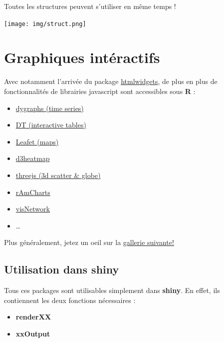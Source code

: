 \documentclass[
]{article}
\providecommand{\tightlist}{%
  \setlength{\itemsep}{0pt}\setlength{\parskip}{0pt}}
\begin{document}
Toutes les structures peuvent s'utiliser en même temps !

\texttt{[image: img/struct.png]}

\hypertarget{graphiques-intuxe9ractifs}{%
\section{Graphiques intéractifs}\label{graphiques-intuxe9ractifs}}

Avec notamment l'arrivée du package
\href{http://www.htmlwidgets.org/}{htmlwidgets}, de plus en plus de
fonctionnalités de librairies javascript sont accessibles sous
\textbf{R} :

\begin{itemize}
\tightlist
\item
  \href{http://rstudio.github.io/dygraphs/}{dygraphs (time series)}
\item
  \href{http://rstudio.github.io/DT/}{DT (interactive tables)}
\item
  \href{http://rstudio.github.io/leaflet/}{Leafet (maps)}
\item
  \href{https://github.com/rstudio/d3heatmap}{d3heatmap}
\item
  \href{http://bwlewis.github.io/rthreejs}{threejs (3d scatter \&
  globe)}
\item
  \href{http://datastorm-open.github.io/introduction_ramcharts/}{rAmCharts}
\item
  \href{http://datastorm-open.github.io/visNetwork}{visNetwork}
\item
  \ldots{}
\end{itemize}

Plus généralement, jetez un oeil sur la
\href{http://gallery.htmlwidgets.org/}{gallerie suivante!}

\hypertarget{utilisation-dans-shiny}{%
\subsection{Utilisation dans shiny}\label{utilisation-dans-shiny}}

Tous ces packages sont utilisables simplement dans \textbf{shiny}. En
effet, ils contiennent les deux fonctions nécessaires :

\begin{itemize}
\tightlist
\item
  \textbf{renderXX}
\item
  \textbf{xxOutput}
\end{itemize}
\end{document}
